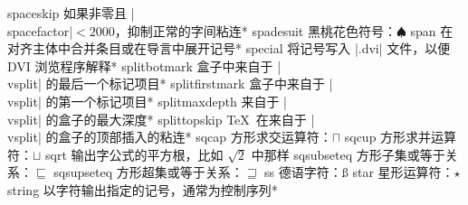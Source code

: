 \capcs spaceskip {如果非零且 |\\spacefactor|${}<2000$，抑制正常的字间粘连}*{}
\capcs spadesuit {黑桃花色符号：$\spadesuit$}{}{}
\capcs span {在对齐主体中合并条目或在导言中展开记号}*{}
\capcs special {将记号写入 |.dvi| 文件，以便 DVI 浏览程序解释}*{}
\capcs splitbotmark {盒子中来自于 |\\vsplit| 的最后一个标记项目}*{}
\capcs splitfirstmark {盒子中来自于 |\\vsplit| 的第一个标记项目}*{}
\capcs splitmaxdepth {来自于 |\\vsplit| 的盒子的最大深度}*{}
\capcs splittopskip {\TeX\ 在来自于 |\\vsplit| 的盒子的顶部插入的粘连}*{}
\capcs sqcap {方形求交运算符：$\sqcap$}{}{}
\capcs sqcup {方形求并运算符：$\sqcup$}{}{}
\capcs sqrt {输出字公式的平方根，比如 $\sqrt 2$ 中那样}{}{}
\capcs sqsubseteq {方形子集或等于关系：$\sqsubseteq$}{}{}
\capcs sqsupseteq {方形超集或等于关系：$\sqsupseteq$}{}{}
\capcs ss {德语字符：\ss}{}{}
\capcs star {星形运算符：$\star$}{}{}
\capcs string {以字符输出指定的记号，通常为控制序列}*{}
